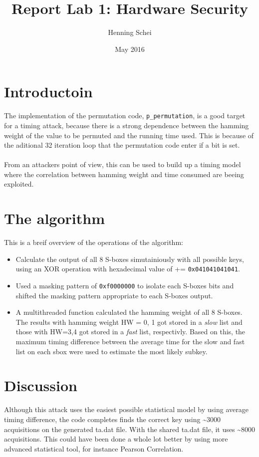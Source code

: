 \documentclass{article}
\title{Report Lab 1: Hardware Security}
\author{Henning Schei}
\date{May 2016}
\begin{document}
\maketitle

\section{Introductoin}
The implementation of the permutation code, \texttt{p\_permutation}, is a good target for a timing attack, because there is a strong dependence between the hamming weight of the value to be permuted and the running time used. This is because of the aditional 32 iteration loop that the permutation code enter if a bit is set. \\ \\ From an attackers point of view, this can be used to build up a timing model where the correlation between hamming weight and time consumed are beeing exploited.       

\section{The algorithm}
 

This is a breif overview of the operations of the algorithm:
\begin{itemize}
\item Calculate the output of all 8 S-boxes simutainiously with all possible keys, using an XOR operation with hexadecimal value of += \texttt{0x041041041041}.  
\item  Used a masking pattern of \texttt{0xf0000000} to isolate each S-boxes bits and shifted the masking pattern appropriate to each S-boxes output. 
\item A multithreaded function calculated the hamming weight of all 8 S-boxes. The results with hamming weight HW = 0, 1  got stored in a \emph{slow} list and those with HW=3,4 got stored in a \emph{fast} list, respectivly.  Based on this, the maximum timing difference between the average time for the slow and fast list on each sbox were used to estimate the most likely subkey.
\end{itemize}


\section{Discussion}
Although this attack uses the easiest possible statistical model by using average timing difference, the code completes finds the correct key using \textasciitilde 3000 acquisitions on the generated ta.dat file. With the shared ta.dat file, it uses \textasciitilde 8000 acquisitions. This could have been done a whole lot better by using more advanced statistical tool, for instance Pearson Correlation. 
\end{document}

